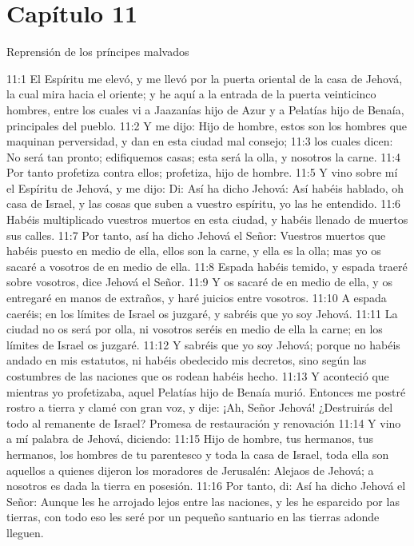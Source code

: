 \section*{Capítulo 11 } 
Reprensión de los príncipes malvados   
  
11:1 El Espíritu me elevó, y me llevó por la puerta oriental de la casa de Jehová, la cual mira hacia el oriente; y he aquí a la entrada de la puerta veinticinco hombres, entre los cuales vi a Jaazanías hijo de Azur y a Pelatías hijo de Benaía, principales del pueblo.   
11:2 Y me dijo: Hijo de hombre, estos son los hombres que maquinan perversidad, y dan en esta ciudad mal consejo;   
11:3 los cuales dicen: No será tan pronto; edifiquemos casas; esta será la olla, y nosotros la carne.   
11:4 Por tanto profetiza contra ellos; profetiza, hijo de hombre.   
11:5 Y vino sobre mí el Espíritu de Jehová, y me dijo: Di: Así ha dicho Jehová: Así habéis hablado, oh casa de Israel, y las cosas que suben a vuestro espíritu, yo las he entendido.   
11:6 Habéis multiplicado vuestros muertos en esta ciudad, y habéis llenado de muertos sus calles.   
11:7 Por tanto, así ha dicho Jehová el Señor: Vuestros muertos que habéis puesto en medio de ella, ellos son la carne, y ella es la olla; mas yo os sacaré a vosotros de en medio de ella.   
11:8 Espada habéis temido, y espada traeré sobre vosotros, dice Jehová el Señor.   
11:9 Y os sacaré de en medio de ella, y os entregaré en manos de extraños, y haré juicios entre vosotros.   
11:10 A espada caeréis; en los límites de Israel os juzgaré, y sabréis que yo soy Jehová.   
11:11 La ciudad no os será por olla, ni vosotros seréis en medio de ella la carne; en los límites de Israel os juzgaré.   
11:12 Y sabréis que yo soy Jehová; porque no habéis andado en mis estatutos, ni habéis obedecido mis decretos, sino según las costumbres de las naciones que os rodean habéis hecho.   
11:13 Y aconteció que mientras yo profetizaba, aquel Pelatías hijo de Benaía murió. Entonces me postré rostro a tierra y clamé con gran voz, y dije: ¡Ah, Señor Jehová! ¿Destruirás del todo al remanente de Israel?   
Promesa de restauración y renovación   
11:14 Y vino a mí palabra de Jehová, diciendo:   
11:15 Hijo de hombre, tus hermanos, tus hermanos, los hombres de tu parentesco y toda la casa de Israel, toda ella son aquellos a quienes dijeron los moradores de Jerusalén: Alejaos de Jehová; a nosotros es dada la tierra en posesión.   
11:16 Por tanto, di: Así ha dicho Jehová el Señor: Aunque les he arrojado lejos entre las naciones, y les he esparcido por las tierras, con todo eso les seré por un pequeño santuario en las tierras adonde lleguen.   
